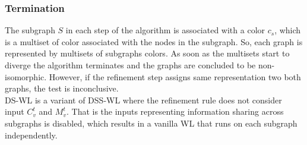 \documentclass[11pt, dvipsnames, DIV=12]{scrreprt}
\theoremstyle{definition}
\begin{document}
\subsubsection{Termination}The subgraph $S$ in each step of the algorithm is associated with a color $c_s$, which is a multiset of color associated with the nodes in the subgraph. So, each graph is represented by multisets of subgraphs colors. As soon as the multisets start to diverge the algorithm terminates and the graphs are concluded to be non-isomorphic. However, if the refinement step assigns same representation two both graphs, the test is inconclusive.\\
DS-WL is a variant of DSS-WL where the refinement rule does not consider input $C^t_v$ and $M^t_v$. That is the inputs representing information sharing across subgraphs is disabled, which results in a vanilla WL that runs on each subgraph independently.
\end{document}
